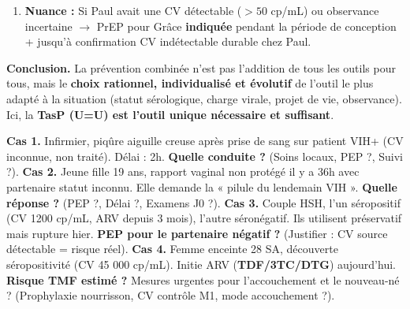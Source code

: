 \documentclass[11pt]{article}
\begin{document}
\begin{exoresolu}
\begin{enumerate}
\begin{itemize}
        \item \textbf{Suivi sérologique Grâce :} Test VIH à 3 mois après conception confirmée (routine grossesse), puis selon protocole PMTCT si grossesse.
    \end{itemize}
    \item \textbf{Nuance :} Si Paul avait une CV détectable ($> 50$ cp/mL) ou observance incertaine $\to$ PrEP pour Grâce \textbf{indiquée} pendant la période de conception + jusqu'à confirmation CV indétectable durable chez Paul.
\end{enumerate}
\tcblower
\textbf{Conclusion.} La prévention combinée n'est pas l'addition de tous les outils pour tous, mais le \textbf{choix rationnel, individualisé et évolutif} de l'outil le plus adapté à la situation (statut sérologique, charge virale, projet de vie, observance). Ici, la \textbf{TasP (U=U) est l'outil unique nécessaire et suffisant}.
\end{exoresolu}

\begin{exercice}
\textbf{Cas 1.} Infirmier, piqûre aiguille creuse après prise de sang sur patient VIH+ (CV inconnue, non traité). Délai : 2h. \textbf{Quelle conduite ?} (Soins locaux, PEP ?, Suivi ?).
\textbf{Cas 2.} Jeune fille 19 ans, rapport vaginal non protégé il y a 36h avec partenaire statut inconnu. Elle demande la « pilule du lendemain VIH ». \textbf{Quelle réponse ?} (PEP ?, Délai ?, Examens J0 ?).
\textbf{Cas 3.} Couple HSH, l'un séropositif (CV 1200 cp/mL, ARV depuis 3 mois), l'autre séronégatif. Ils utilisent préservatif mais rupture hier. \textbf{PEP pour le partenaire négatif ?} (Justifier : CV source détectable = risque réel).
\textbf{Cas 4.} Femme enceinte 28 SA, découverte séropositivité (CV 45 000 cp/mL). Initie ARV (\textbf{TDF/3TC/DTG}) aujourd'hui. \textbf{Risque TMF estimé ?} Mesures urgentes pour l'accouchement et le nouveau-né ? (Prophylaxie nourrisson, CV contrôle M1, mode accouchement ?).
\end{exercice}
\end{document}
